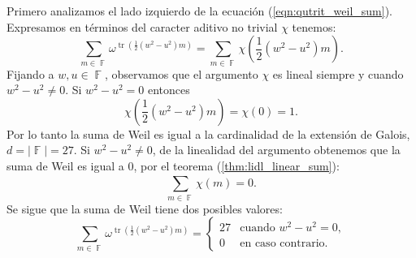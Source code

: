 \documentclass[a4paper]{report}
\DeclareMathOperator{\F}{\mathbb{F}}
\DeclareMathOperator{\tr}{tr}
\begin{document}
  Primero analizamos el lado izquierdo de la ecuación
  (\ref{eqn:qutrit_weil_sum}). Expresamos en términos del
  caracter aditivo no trivial $\chi$ tenemos:
  \begin{equation}
    \sum_{m \in \F}^{} \omega^{\tr\left( \frac{1}{2} \left(
    w^2-u^2\right) m \right) }
    = \sum_{m \in \F}^{} \chi\left( \frac{1}{2} \left(
    w^2-u^2 \right) m \right).
  \end{equation}
  Fijando a $w, u \in \F$, observamos que el argumento
  $\chi$ es lineal siempre y cuando $w^2-u^2 \neq 0$. Si
  $w^2-u^2 = 0$ entonces
  \begin{equation}
    \chi\left( \frac{1}{2} \left(w^2-u^2\right) m \right) 
    = \chi(0)
    = 1.
  \end{equation}
  Por lo tanto la suma de Weil es igual a la cardinalidad de
  la extensión de Galois, $d = |\F| = 27$. Si $w^2-u^2 \neq
  0$, de la linealidad del argumento obtenemos que la suma
  de Weil es igual a 0, por el teorema
  (\ref{thm:lidl_linear_sum}):
  \begin{equation}
    \sum_{m \in \F}^{} \chi(m) = 0.
  \end{equation}
  Se sigue que la suma de Weil tiene dos posibles valores:
  \begin{equation}
    \label{eqn:left_weil_sum}
    \sum_{m \in \F}^{} \omega^{\tr\left(
    \frac{1}{2}(w^2-u^2)m \right) }
    = 
    \begin{cases}
      27 & \text{cuando } w^2-u^2 = 0, \\
      0 & \text{en caso contrario}.
    \end{cases}
  \end{equation}
\end{document}
